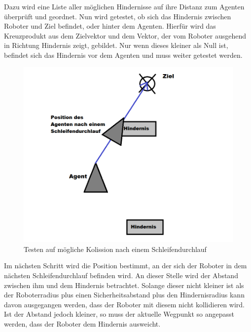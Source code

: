 Dazu wird eine Liste aller möglichen Hindernisse auf ihre Distanz zum Agenten überprüft und geordnet. Nun wird getestet, ob sich das Hindernis zwischen Roboter und Ziel befindet, oder hinter dem Agenten. Hierfür wird das Kreuzprodukt aus dem Zielvektor und dem Vektor, der vom Roboter ausgehend in Richtung Hindernis zeigt, gebildet. Nur wenn dieses kleiner als Null ist, befindet sich das Hindernis vor dem Agenten und muss weiter getestet werden. 
\begin{figure}[h]
	\centering
	\includegraphics[height=0.3\pageheight,keepaspectratio]{pics/Avoidance2} 
	\caption{Testen auf mögliche Kolission nach einem Schleifendurchlauf}
\end{figure}
Im nächsten Schritt wird die Position bestimmt, an der sich der Roboter in dem nächsten Schleifendurchlauf befinden wird. An dieser Stelle wird der Abstand zwischen ihm und dem Hindernis betrachtet. Solange dieser nicht kleiner ist als der Roboterradius plus einen Sicherheitsabstand plus den Hindernisradius kann davon ausgegangen werden, dass der Roboter mit diesem nicht kollidieren wird. Ist der Abstand jedoch kleiner, so muss der aktuelle Wegpunkt so angepasst werden, dass der Roboter dem Hindernis ausweicht. 
